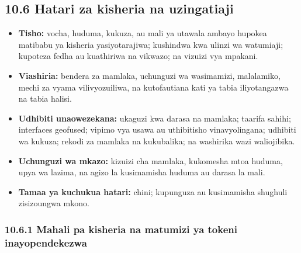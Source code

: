 \documentclass[11pt]{article}
\begin{document}
\subsection*{10.6 Hatari za kisheria na uzingatiaji}

\begin{itemize}[leftmargin=*]
\item \textbf{Tisho:} vocha, huduma, kukuza, au mali ya utawala ambayo hupokea matibabu ya kisheria yasiyotarajiwa; kushindwa kwa ulinzi wa watumiaji; kupoteza fedha au kuathiriwa na vikwazo; na vizuizi vya mpakani.
\item \textbf{Viashiria:} bendera za mamlaka, uchunguzi wa wasimamizi, malalamiko, mechi za vyama vilivyozuiliwa, na kutofautiana kati ya tabia iliyotangazwa na tabia halisi.
\item \textbf{Udhibiti unaowezekana:} ukaguzi kwa darasa na mamlaka; taarifa sahihi; interfaces geofused; vipimo vya usawa au uthibitisho vinavyolingana; udhibiti wa kukuza; rekodi za mamlaka na kukubalika; na washirika wazi waliojibika.
\item \textbf{Uchunguzi wa mkazo:} kizuizi cha mamlaka, kukomesha mtoa huduma, upya wa lazima, na agizo la kusimamisha huduma au darasa la mali.
\item \textbf{Tamaa ya kuchukua hatari:} chini; kupunguza au kusimamisha shughuli zisizoungwa mkono.
\end{itemize}
\subsubsection*{10.6.1 Mahali pa kisheria na matumizi ya tokeni inayopendekezwa}
\end{document}
